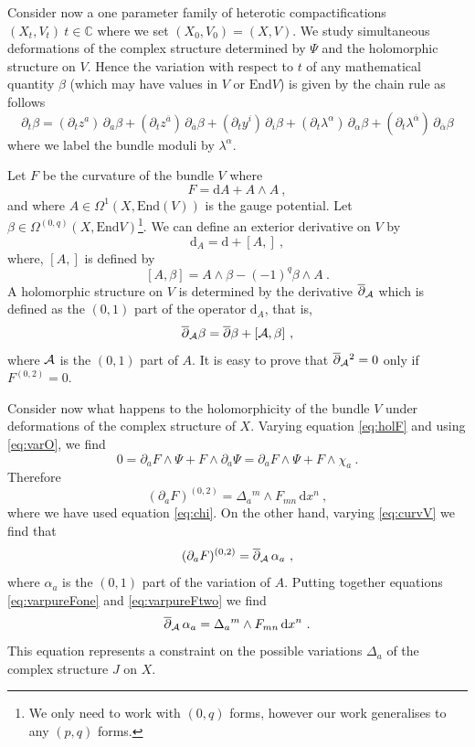 \documentclass[12pt,a4paper]{article}
\newcommand{\IC}{\mathbb{C}}
\def\bar#1{\overline{#1}}
\def\d{\textrm{d}}
\def\End{\textrm{End}}
\def\bp{\bar{\partial}}
\theoremstyle{definition}
\begin{document}
Consider now a one parameter family of heterotic compactifications $(X_t, V_t)~t\in\IC$
where we set  $(X_0, V_0) = (X, V)$.
We study simultaneous deformations of the complex structure determined by $\Psi$ and the holomorphic structure on $V$.  Hence the variation with respect to $t$ of any mathematical quantity $\beta$ (which may have values in $V$ or $\End V$) is given by the chain rule as follows
\begin{equation*}
\partial_t\beta = (\partial_t z^a)\, \partial_a\beta+ 
(\partial_t z^{\bar a})\, \partial_{\bar a}\beta + (\partial_t y^i)\, \partial_i\beta
+ (\partial_t \lambda^\alpha)\, \partial_\alpha\beta
+ (\partial_t \lambda^{\bar\alpha})\, \partial_{\bar\alpha}\beta
\end{equation*}
where we label the bundle moduli by $\lambda^\alpha$.

Let $F$ be the curvature of the bundle $V$ where
\begin{equation}
F = \d A + A\wedge A~,\label{eq:curvV}
\end{equation}
and where $A\in\Omega^1(X,\End(V))$ is the gauge potential.  
Let $\beta\in\Omega^{(0,q)}(X, \End V)$\footnote{We only need to work with $(0,q)$ forms, however our work generalises to any $(p,q)$ forms.}.   We can define an exterior derivative on
$V$ by
\begin{equation} \d_A = \d + [A, ]~,
\label{eq:dA} 
\end{equation}
where, $[A, ]$ is defined by
\[ [A, \beta] = A\wedge\beta - (-1)^q\beta\wedge A~.\]
A holomorphic structure on $V$ is determined by the derivative $\bar\partial_{\cal A}$ which is defined as the $(0,1)$ part of the operator $\d_A$, that is,
\begin{equation} \bar\partial_{\cal A} \beta = \bp\beta + [{\cal A}, \beta]~,
\label{eq:bpA}
\end{equation}
where $\cal A$ is the $(0,1)$ part of $A$.  It is easy to prove that $\bp_{\cal A}{}^2 = 0$ only if $F^{(0,2)} = 0$.  

Consider now what happens to the holomorphicity of the bundle $V$ under deformations of the complex structure of $X$.   
Varying equation \eqref{eq:holF} and using \eqref{eq:varO}, we find
\[0= \partial_a F\wedge\Psi + F\wedge\partial_a\Psi = \partial_a F\wedge\Psi + F\wedge\chi_a~.\]
Therefore
\begin{equation}
 (\partial_a F)^{(0,2)} = \Delta_a{}^m\wedge F_{mn}\, \d x^n~,\label{eq:varpureFone}
 \end{equation}
where we have used equation \eqref{eq:chi}.
On the other hand, varying \eqref{eq:curvV} we find that
\begin{equation}
 (\partial_a F)^{(0,2)} = \bar\partial_{\cal A}\,\alpha_a~,\label{eq:varpureFtwo}
 \end{equation}
 where $\alpha_a$ is the $(0,1)$ part of the variation of $A$.   Putting together equations \eqref{eq:varpureFone} and \eqref{eq:varpureFtwo} we find
 \begin{equation}
 \bar\partial_{\cal A}\,\alpha_a = \Delta_a{}^m\wedge F_{mn}\, \d x^n~.\label{eq:atiyahF}
 \end{equation}
 This equation represents a constraint on the possible variations $\Delta_a$ of the complex structure $J$ on $X$.
 
\end{document}

